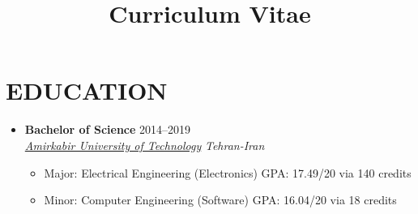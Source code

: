 \documentclass[10pt,a4paper,sans]{moderncv} %
\title{Curriculum Vitae}
\newcommand*{\authorimg}[1]{%
	\raisebox{-.3\baselineskip}{%
		\texttt{[image: \#1]}%
	}%
}
\begin{document}
	
\makecvtitle

\section{EDUCATION}

\begin{itemize}
	
	\item \textbf{Bachelor of Science} \hfill 2014--2019 \\
	\href{http://aut.ac.ir/}{\authorimg{pictures/aut.png} \emph{Amirkabir University of Technology}} \hfill \emph{Tehran-Iran}
	
	\begin{itemize}
		\item Major: Electrical Engineering (Electronics) \hspace{30 pt}  GPA: 17.49/20 via 140 credits
		\item Minor: Computer Engineering (Software) \hspace{37 pt} GPA: 16.04/20 via 18 credits
	\end{itemize}
	
	
\end{itemize}


%
%	
%	
\end{document}

